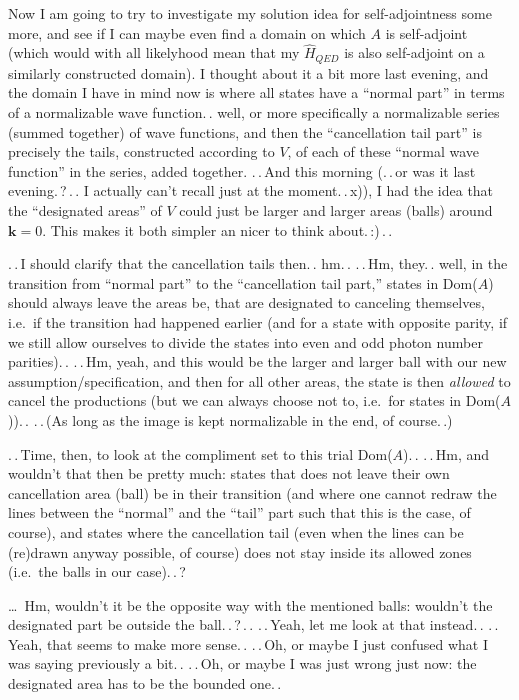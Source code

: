 \documentclass{report}
\begin{document}
Now I am going to try to investigate my solution idea for self-adjointness some more, and see if I can maybe even find a domain on which $A$ is self-adjoint (which would with all likelyhood mean that my $\hat H_{QED}$ is also self-adjoint on a similarly constructed domain). I thought about it a bit more last evening, and the domain I have in mind now is where all states have a ``normal part'' in terms of a normalizable wave function.\,. well, or more specifically a normalizable series (summed together) of wave functions, and then the ``cancellation tail part'' is precisely the tails, constructed according to $V$, of each of these ``normal wave function'' in the series, added together. %
.\,.\,And this morning (.\,.\,or was it last evening.\,?\,.\,. I actually can't recall just at the moment.\,.\,x)), I had the idea that the ``designated areas'' of $V$ could just be larger and larger areas (balls) around $\mathbf{k}=0$. This makes it both simpler an nicer to think about.\,:)\,.\,. 

.\,.\,I should clarify that the cancellation tails then.\,. hm.\,. .\,.\,Hm, they.\,. well, in the transition from ``normal part'' to the ``cancellation tail part,'' states in Dom($A$) should always leave the areas be, that are designated to canceling themselves, i.e.\ if the transition had happened earlier (and for a state with opposite parity, if we still allow ourselves to divide the states into even and odd photon number parities).\,. .\,.\,Hm, yeah, and this would be the larger and larger ball with our new assumption/specification, and then for all other areas, the state is then \emph{allowed} to cancel the productions (but we can always choose not to, i.e.\ for states in Dom($A$)).\,. .\,.\,(As long as the image is kept normalizable in the end, of course.\,.)

.\,.\,Time, then, to look at the compliment set to this trial Dom($A$).\,. %
.\,.\,Hm, and wouldn't that then be pretty much: states that does not leave their own cancellation area (ball) be in their transition (and where one cannot redraw the lines between the ``normal'' and the ``tail'' part such that this is the case, of course), and states where the cancellation tail (even when the lines can be (re)drawn anyway possible, of course) does not stay inside its allowed zones (i.e.\ the balls in our case).\,.\,? %

\ldots\ Hm, wouldn't it be the opposite way with the mentioned balls: wouldn't the designated part be outside the ball.\,.\,?\,.\,. .\,.\,Yeah, let me look at that instead.\,. .\,.\,Yeah, that seems to make more sense.\,. .\,.\,Oh, or maybe I just confused what I was saying previously a bit.\,. .\,.\,Oh, or maybe I was just wrong just now: the designated area has to be the bounded one.\,. %
\end{document}
